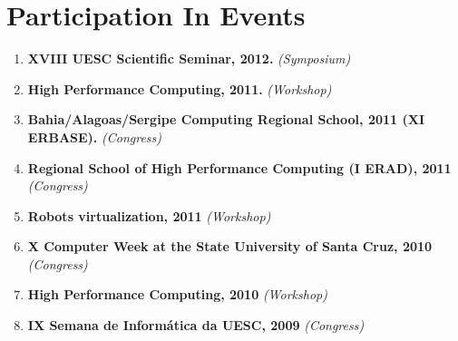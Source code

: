 \documentclass[10pt, a4paper, oneside, final]{scrartcl} %
\begin{document}

\section{Participation In Events}

\begin{enumerate}\itemsep1.5pt

\item \textbf{XVIII UESC Scientific Seminar, 2012.} \textit{(Symposium)}

\item \textbf{High Performance Computing, 2011.} \textit{(Workshop)}

\item \textbf{Bahia/Alagoas/Sergipe Computing Regional School, 2011 (XI ERBASE).}
 \textit{(Congress)}

\item \textbf{Regional School of High Performance Computing (I ERAD), 2011} \textit{(Congress)}

\item \textbf{Robots virtualization, 2011} \textit{(Workshop)}

\item \textbf{X Computer Week at the State University of Santa Cruz, 2010} \textit{(Congress)}

\item \textbf{High Performance Computing, 2010} \textit{(Workshop)}

\item \textbf{IX Semana de Informática da UESC, 2009} \textit{(Congress)}


\end{enumerate}

\end{document}
